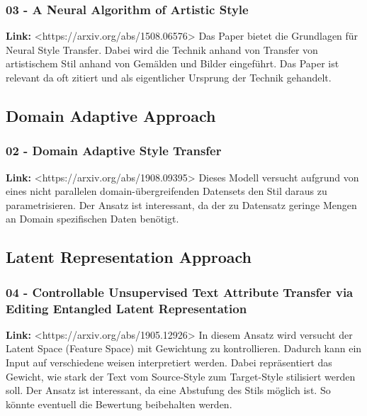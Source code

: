 \subsubsection{03 - A Neural Algorithm of Artistic Style}
\textbf{Link: } <https://arxiv.org/abs/1508.06576>
\newline
\newline
Das Paper bietet die Grundlagen für Neural Style Transfer. Dabei wird die Technik anhand von Transfer von artistischem
Stil anhand von Gemälden und Bilder eingeführt.
\newline
\newline
Das Paper ist relevant da oft zitiert und als eigentlicher Ursprung der Technik gehandelt.

\subsection{Domain Adaptive Approach}

\subsubsection{02 - Domain Adaptive Style Transfer}
\textbf{Link: } <https://arxiv.org/abs/1908.09395>
\newline
\newline
Dieses Modell versucht aufgrund von eines nicht parallelen domain-übergreifenden Datensets den Stil daraus zu
parametrisieren.
\newline
\newline
Der Ansatz ist interessant, da der zu Datensatz geringe Mengen an Domain spezifischen Daten benötigt.

\subsection{Latent Representation Approach}

\subsubsection{04 - Controllable Unsupervised Text Attribute Transfer via Editing Entangled Latent Representation}
\textbf{Link: } <https://arxiv.org/abs/1905.12926>
\newline
\newline
In diesem Ansatz wird versucht der Latent Space (Feature Space) mit Gewichtung zu kontrollieren. Dadurch kann ein Input
auf verschiedene weisen interpretiert werden. Dabei repräsentiert das Gewicht, wie stark der Text vom Source-Style zum
Target-Style stilisiert werden soll.
\newline
\newline
Der Ansatz ist interessant, da eine Abstufung des Stils möglich ist. So könnte eventuell die Bewertung beibehalten
werden.

